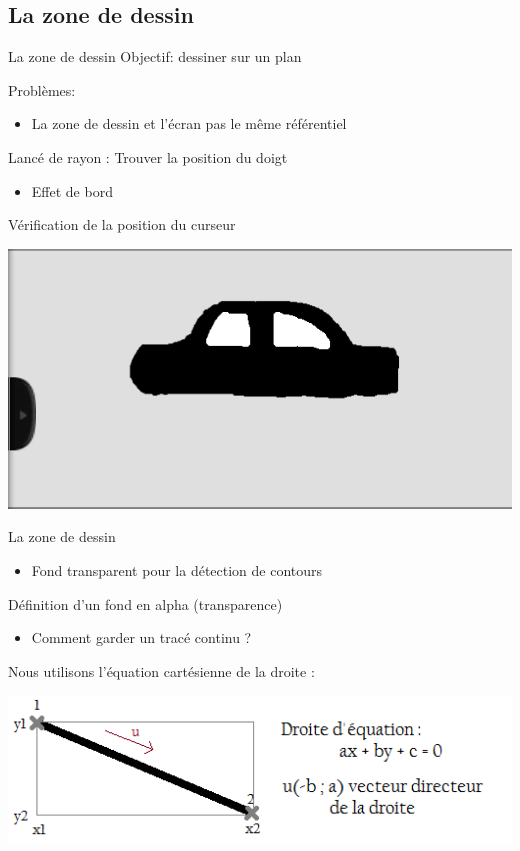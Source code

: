 \documentclass[a4paper,10pt]{beamer}
\begin{document}
	\subsection{La zone de dessin}
	\begin{frame}{La zone de dessin}
		Objectif: dessiner sur un plan
			
		Problèmes:
			\begin{itemize}
				\item La zone de dessin et l'écran pas le même référentiel
				
			\end{itemize} 
			Lancé de rayon : 
			Trouver la position du doigt
			\begin{itemize}
				\item Effet de bord
			\end{itemize}
			Vérification de la position du curseur	
		\centerline{\includegraphics[scale=0.3]{images/Nono/img1.png}}
	\end{frame}
	
	\begin{frame}{La zone de dessin}
			\begin{itemize}
				\item Fond transparent pour la détection de contours
			\end{itemize} 
			Définition d'un fond en alpha (transparence)
			\begin{itemize}
				\item Comment garder un tracé continu ?
			\end{itemize}
			Nous utilisons l'équation cartésienne de la droite :
			\centerline{\includegraphics[scale=0.6]{images/intro/trait.png}}
	\end{frame}
\end{document}
